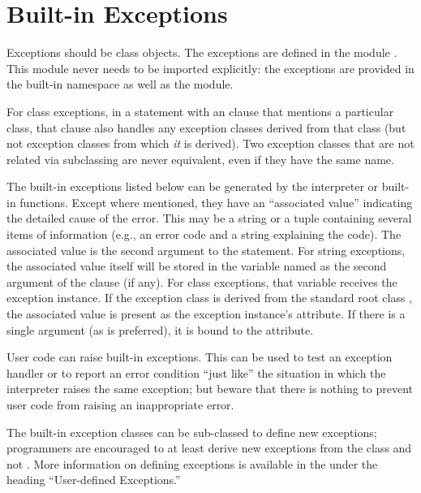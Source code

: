 \section{Built-in Exceptions}



Exceptions should be class objects.  
The exceptions are defined in the module .  This
module never needs to be imported explicitly: the exceptions are
provided in the built-in namespace as well as the 
module.

For class exceptions, in a  statement with
an  clause that mentions a particular
class, that clause also handles any exception classes derived from
that class (but not exception classes from which \emph{it} is
derived).  Two exception classes that are not related via subclassing
are never equivalent, even if they have the same name.

The built-in exceptions listed below can be generated by the
interpreter or built-in functions.  Except where mentioned, they have
an ``associated value'' indicating the detailed cause of the error.
This may be a string or a tuple containing several items of
information (e.g., an error code and a string explaining the code).
The associated value is the second argument to the
 statement.  For string exceptions, the
associated value itself will be stored in the variable named as the
second argument of the  clause (if any).  For class
exceptions, that variable receives the exception instance.  If the
exception class is derived from the standard root class
, the associated value is present as the
exception instance's  attribute.  If there is a single argument
(as is preferred), it is bound to the  attribute.

User code can raise built-in exceptions.  This can be used to test an
exception handler or to report an error condition ``just like'' the
situation in which the interpreter raises the same exception; but
beware that there is nothing to prevent user code from raising an
inappropriate error.

The built-in exception classes can be sub-classed to define new
exceptions; programmers are encouraged to at least derive new
exceptions from the  class and not
.  More
information on defining exceptions is available in the
 under the heading
``User-defined Exceptions.''

